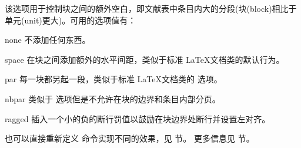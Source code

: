 \begin{optionlist}
\begin{valuelist}
\end{valuelist}


该选项用于控制块之间的额外空白，即文献表中条目内大的分段(块(block)相比于单元(unit)更大)。可用的选项值有：

\begin{valuelist}

\item[none] %
不添加任何东西。

\item[space] %
在块之间添加额外的水平间距，类似于标准 \LaTeX 文档类的默认行为。

\item[par] %
每一块都另起一段，类似于标准 \LaTeX 文档类的  选项。

\item[nbpar] %
类似于  选项但是不允许在块的边界和条目内部分页。

\item[ragged] %
插入一个小的负的断行罚值以鼓励在块边界处断行并设置左对齐。

\end{valuelist}


也可以直接重新定义  命令实现不同的效果，见   节。
更多信息见  节。




\end{optionlist}
